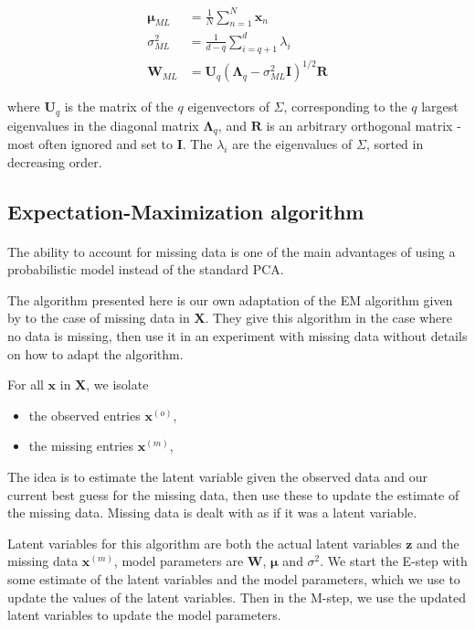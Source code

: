 \documentclass{article}
\begin{document}
\begin{align}
    \label{eq:ppca_mu_ml}
    \boldsymbol{\mu}_{ML} &= \frac{1}{N} \sum_{n=1}^N \mathbf{x}_n \\
    \label{eq:ppca_sigma_ml}
    \sigma^2_{ML} &= \frac{1}{d-q} \sum_{i=q+1}^d \lambda_i\\
    \label{eq:ppca_W_ml}
    \mathbf{W}_{ML} &= \mathbf{U}_q \left(\mathbf{\Lambda}_q - \sigma_{ML}^2\mathbf{I}\right)^{1/2} \mathbf{R}
\end{align}

where $\mathbf{U}_q$ is the matrix of the $q$ eigenvectors of $\Sigma$, corresponding to the $q$ largest eigenvalues in the diagonal matrix $\mathbf{\Lambda}_q$, and $\mathbf{R}$ is an arbitrary orthogonal matrix - most often ignored and set to $\mathbf{I}$. The $\lambda_i$ are the eigenvalues of $\Sigma$, sorted in decreasing order.

\subsection{Expectation-Maximization algorithm}
\label{sec:ppca_em}

\paragraph{} The ability to account for missing data is one of the main advantages of using a probabilistic model instead of the standard PCA.

The algorithm presented here is our own adaptation of the EM algorithm given by \citet{PPCA} to the case of missing data in $\mathbf{X}$. They give this algorithm in the case where no data is missing, then use it in an experiment with missing data without details on how to adapt the algorithm.

For all $\mathbf{x}$ in $\mathbf{X}$, we isolate
\begin{itemize}
    \item the observed entries $\mathbf{x}^{(o)}$,
    \item the missing entries $\mathbf{x}^{(m)}$,
\end{itemize}

The idea is to estimate the latent variable given the observed data and our current best guess for the missing data, then use these to update the estimate of the missing data. Missing data is dealt with as if it was a latent variable.

Latent variables for this algorithm are both the actual latent variables $\mathbf{z}$ and the missing data $\mathbf{x}^{(m)}$, model parameters are $\mathbf{W}$, $\boldsymbol{\mu}$ and $\sigma^2$. We start the E-step with some estimate of the latent variables and the model parameters, which we use to update the values of the latent variables. Then in the M-step, we use the updated latent variables to update the model parameters.
\end{document}
